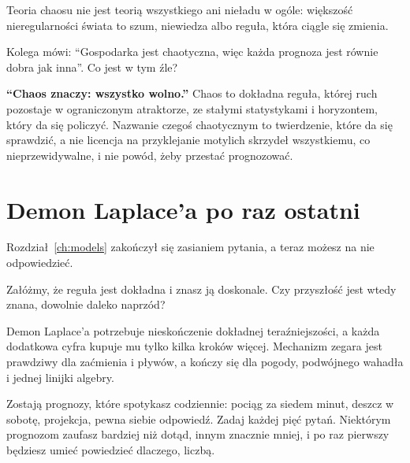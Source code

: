 Teoria chaosu nie jest teorią wszystkiego ani nieładu w ogóle: większość
nieregularności świata to szum, niewiedza albo reguła, która ciągle się
zmienia.

\begin{think}
Kolega mówi: \enquote{Gospodarka jest chaotyczna, więc każda prognoza jest
równie dobra jak inna}. Co jest w tym źle?
\end{think}

\begin{trapbox}
\textbf{\enquote{Chaos znaczy: wszystko wolno.}} Chaos to dokładna reguła,
której ruch pozostaje w ograniczonym atraktorze, ze stałymi statystykami i
horyzontem, który da się policzyć. Nazwanie czegoś chaotycznym to
twierdzenie, które da się sprawdzić, a nie licencja na przyklejanie
motylich skrzydeł wszystkiemu, co nieprzewidywalne, i nie powód, żeby
przestać prognozować.
\end{trapbox}

\section{Demon Laplace'a po raz ostatni}
\label{sec:ch18-demon}

\noindent
Rozdział~\ref{ch:models} zakończył się zasianiem pytania, a teraz możesz
na nie odpowiedzieć.

\begin{think}
Załóżmy, że reguła jest dokładna i znasz ją doskonale. Czy przyszłość jest
wtedy znana, dowolnie daleko naprzód?
\end{think}
Demon Laplace'a potrzebuje nieskończenie dokładnej teraźniejszości, a każda
dodatkowa cyfra kupuje mu tylko kilka kroków więcej. Mechanizm zegara jest
prawdziwy dla zaćmienia i pływów, a kończy się dla pogody, podwójnego
wahadła i jednej linijki algebry.

Zostają prognozy, które spotykasz codziennie: pociąg za siedem minut,
deszcz w sobotę, projekcja, pewna siebie odpowiedź. Zadaj każdej pięć
pytań. Niektórym prognozom zaufasz bardziej niż dotąd, innym znacznie
mniej, i po raz pierwszy będziesz umieć powiedzieć dlaczego, liczbą.

